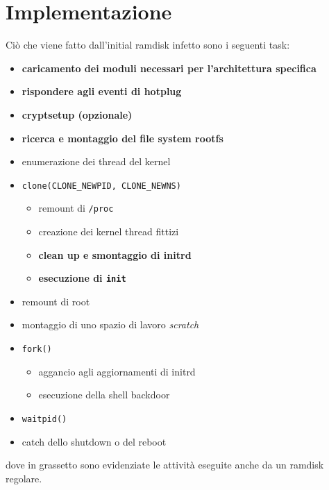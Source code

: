 \documentclass{article}
\begin{document}
\section{Implementazione}
Ciò che viene fatto dall'initial ramdisk infetto sono i seguenti task:
\begin{itemize}
	\item \textbf{caricamento dei moduli necessari per l'architettura specifica}
	\item \textbf{rispondere agli eventi di hotplug}
	\item \textbf{cryptsetup (opzionale)}
	\item \textbf{ricerca e montaggio del file system rootfs}
	\item enumerazione dei thread del kernel
	\item \texttt{clone(CLONE\_NEWPID, CLONE\_NEWNS)}
	\begin{itemize}
		\item remount di \texttt{/proc}
		\item creazione dei kernel thread fittizi
		\item \textbf{clean up e smontaggio di initrd}
		\item \textbf{esecuzione di \texttt{init}}
	\end{itemize}
	\item remount di root
	\item montaggio di uno spazio di lavoro \textsl{scratch}
	\item \texttt{fork()}
	\begin{itemize}
		\item aggancio agli aggiornamenti di initrd
		\item esecuzione della shell backdoor
	\end{itemize}
	\item \texttt{waitpid()}
	\item catch dello shutdown o del reboot
\end{itemize}
dove in grassetto sono evidenziate le attività eseguite anche da un ramdisk regolare.
\end{document}
